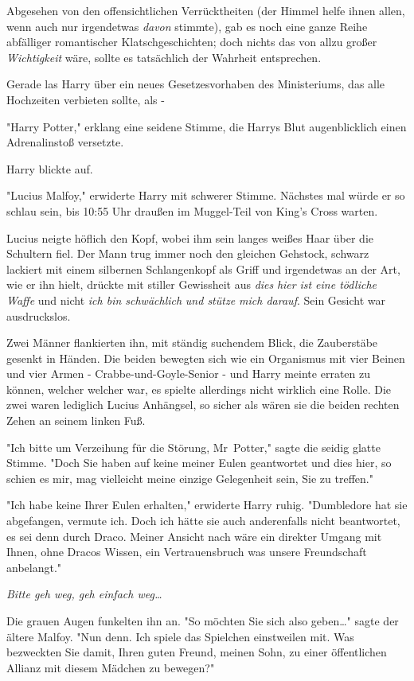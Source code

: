 {Abgesehen von den offensichtlichen Verrücktheiten (der Himmel helfe ihnen allen, wenn auch nur irgendetwas \emph{davon} stimmte), gab es noch eine ganze Reihe abfälliger romantischer Klatschgeschichten; doch nichts das von allzu großer \emph{Wichtigkeit} wäre, sollte es tatsächlich der Wahrheit entsprechen.

Gerade las Harry über ein neues Gesetzesvorhaben des Ministeriums, das alle Hochzeiten verbieten sollte, als -

"Harry Potter," erklang eine seidene Stimme, die Harrys Blut augenblicklich einen Adrenalinstoß versetzte.

Harry blickte auf.

"Lucius Malfoy," erwiderte Harry mit schwerer Stimme. Nächstes mal würde er so schlau sein, bis 10:55 Uhr draußen im Muggel-Teil von King's Cross warten.

Lucius neigte höflich den Kopf, wobei ihm sein langes weißes Haar über die Schultern fiel. Der Mann trug immer noch den gleichen Gehstock, schwarz lackiert mit einem silbernen Schlangenkopf als Griff und irgendetwas an der Art, wie er ihn hielt, drückte mit stiller Gewissheit aus \emph{dies} \emph{hier} \emph{ist eine tödliche Waffe} und nicht \emph{ich bin schwächlich} \emph{und stütze mich darauf}. Sein Gesicht war ausdruckslos.

Zwei Männer flankierten ihn, mit ständig suchendem Blick, die Zauberstäbe gesenkt in Händen. Die beiden bewegten sich wie ein Organismus mit vier Beinen und vier Armen - Crabbe-und-Goyle-Senior - und Harry meinte erraten zu können, welcher welcher war, es spielte allerdings nicht wirklich eine Rolle. Die zwei waren lediglich Lucius Anhängsel, so sicher als wären sie die beiden rechten Zehen an seinem linken Fuß.

"Ich bitte um Verzeihung für die Störung, Mr~Potter," sagte die seidig glatte Stimme. "Doch Sie haben auf keine meiner Eulen geantwortet und dies hier, so schien es mir, mag vielleicht meine einzige Gelegenheit sein, Sie zu treffen."

"Ich habe keine Ihrer Eulen erhalten," erwiderte Harry ruhig. "Dumbledore hat sie abgefangen, vermute ich. Doch ich hätte sie auch anderenfalls nicht beantwortet, es sei denn durch Draco. Meiner Ansicht nach wäre ein direkter Umgang mit Ihnen, ohne Dracos Wissen, ein Vertrauensbruch was unsere Freundschaft anbelangt."

\emph{Bitte geh weg, geh einfach weg…}

Die grauen Augen funkelten ihn an. "So möchten Sie sich also geben…" sagte der ältere Malfoy. "Nun denn. Ich spiele das Spielchen einstweilen mit. Was bezweckten Sie damit, Ihren guten Freund, meinen Sohn, zu einer öffentlichen Allianz mit diesem Mädchen zu bewegen?"

}
